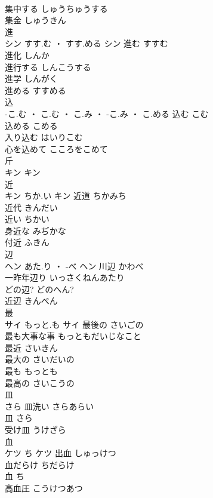 \documentclass[8pt]{extreport}
\begin{document}
\begin{CJK}{UTF8}{min}
\\	集中する	しゅうちゅうする	
\\	集金	しゅうきん	
\\	進	
\\	シン	すす.む ・ すす.める	シン	進む	すすむ	
\\	進化	しんか	
\\	進行する	しんこうする	
\\	進学	しんがく	
\\	進める	すすめる	
\\	込	
\\	-こ.む ・ こ.む ・ こ.み ・ -こ.み ・ こ.める		込む	こむ	
\\	込める	こめる	
\\	入り込む	はいりこむ	
\\	心を込めて	こころをこめて	
\\	斤	
\\	キン		キン																																			
\\	近	
\\	キン	ちか.い	キン	近道	ちかみち	
\\	近代	きんだい	
\\	近い	ちかい	
\\	身近な	みぢかな	
\\	付近	ふきん	
\\	辺	
\\	ヘン	あた.り ・ -べ	ヘン	川辺	かわべ	
\\	一昨年辺り	いっさくねんあたり	
\\	どの辺?	どのへん?	
\\	近辺	きんぺん	
\\	最	
\\	サイ	もっと.も	サイ	最後の	さいごの	
\\	最も大事な事	もっともだいじなこと	
\\	最近	さいきん	
\\	最大の	さいだいの	
\\	最も	もっとも	
\\	最高の	さいこうの	
\\	皿	
\\	さら		皿洗い	さらあらい	
\\	皿	さら	
\\	受け皿	うけざら	
\\	血	
\\	ケツ	ち	ケツ	出血	しゅっけつ	
\\	血だらけ	ちだらけ	
\\	血	ち	
\\	高血圧	こうけつあつ	

\end{CJK}
\end{document}
